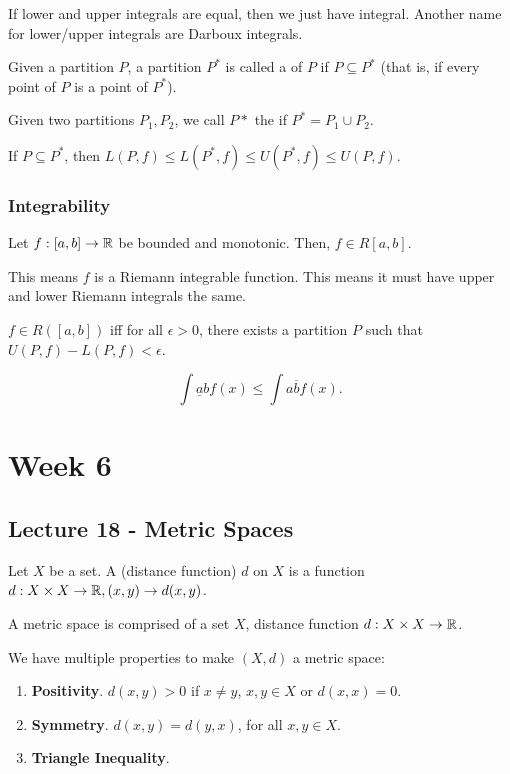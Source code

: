\documentclass{book}
\begin{document}
If lower and upper integrals are equal, then we just have integral. Another name for lower/upper integrals are Darboux integrals.

\begin{defn}
    Given a partition $P$, a partition $P^*$ is called a  of $P$ if $P \subseteq P^*$ (that is, if every point of $P$ is a point of $P^*$). 
\end{defn}

Given two partitions $P_1, P_2$, we call $P*$ the  if $P^* = P_1 \cup P_2$.

\begin{lemma}
    If $P \subseteq P^*$, then $L(P, f) \leq L(P^*, f) \leq U(P^*, f) \leq U(P, f)$.
\end{lemma}

\subsection{Integrability}
\begin{thm}
    Let $f: [a, b] \to \mathbb{R}$ be bounded and monotonic. Then, $f \in R[a, b]$.

    This means $f$ is a Riemann integrable function. This means it must have upper and lower Riemann integrals the same.
\end{thm}

\begin{thm}
    $f \in R([a, b])$ iff for all $\epsilon > 0$, there exists a partition $P$ such that $U(P, f) - L(P, f) < \epsilon$.
\end{thm}

\begin{thm}
    \[\int{\underline{a}}{b} f(x) \leq \int{a}{\overline{b}} f(x).\]
\end{thm}
\chapter{Week 6}
\section{Lecture 18 - Metric Spaces}
\begin{defn} Let $X$ be a set. A  (distance function) $d$ on $X$ is a function $d : X \times X \to \mathbb{R}, (x, y) \to d(x, y)$.
\end{defn}

\begin{defn}
    A metric space is comprised of a set $X$, distance function $d : X \times X \to \mathbb{R}$.

    We have multiple properties to make $(X, d)$ a metric space:
    \begin{enumerate}
        \item \textbf{Positivity}. $d(x, y) > 0$ if $x \neq y$, $x, y \in X$ or $d(x, x) = 0$.
        \item \textbf{Symmetry}. $d(x, y) = d(y, x)$, for all $x, y \in X$.
        \item \textbf{Triangle Inequality}.
    \end{enumerate}
\end{defn}
\end{document}
